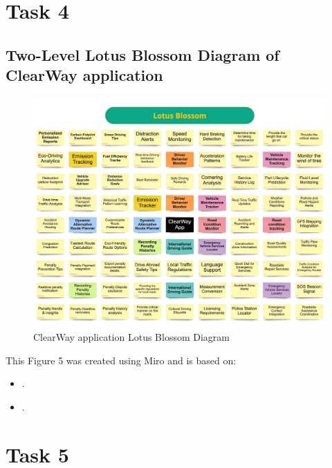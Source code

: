 \documentclass[12pt,a4paper]{article}
\begin{document}
\setcounter{page}{9}
\label{sec:Question 4}
\section{Task 4}

\subsection{Two-Level Lotus Blossom Diagram of ClearWay application}
\begin{figure}[htbp]
    \centering
    \includegraphics[width=1\textwidth]{images/Lotus Blossom.jpg}
    \caption{ClearWay application Lotus Blossom Diagram}
    \label{fig:example}
\end{figure}

This Figure 5 was created using Miro and is based on:
\begin{itemize}
    \item \cite{Ref3.1}.
    \item \cite{Ref3.2}.  
\end{itemize}

\pagebreak


\setcounter{page}{10}
\label{sec:Question 5}
\section{Task 5}
\end{document}
